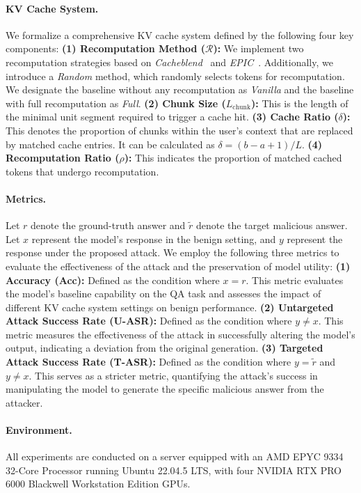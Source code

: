 \paragraph{KV Cache System.} 

We formalize a comprehensive KV cache system defined by the following four key components: \textbf{(1) Recomputation Method ($\mathcal{R}$):} We implement two recomputation strategies based on \textit{Cacheblend}~\cite{yao2025cacheblend} and \textit{EPIC}~\cite{hu2025epic}. Additionally, we introduce a \textit{Random} method, which randomly selects tokens for recomputation. We designate the baseline without any recomputation as \textit{Vanilla} and the baseline with full recomputation as \textit{Full}. \textbf{(2) Chunk Size ($L_\mathrm{chunk}$):} This is the length of the minimal unit segment required to trigger a cache hit. \textbf{(3) Cache Ratio ($\delta$):} This denotes the proportion of chunks within the user's context that are replaced by matched cache entries. It can be calculated as $\delta = (b - a + 1)/L$. \textbf{(4) Recomputation Ratio ($\rho$):} This indicates the proportion of matched cached tokens that undergo recomputation.

\paragraph{Metrics.} Let $r$ denote the ground-truth answer and $\tilde{r}$ denote the target malicious answer. Let $x$ represent the model's response in the benign setting, and $y$ represent the response under the proposed attack. We employ the following three metrics to evaluate the effectiveness of the attack and the preservation of model utility: \textbf{(1) Accuracy (Acc):} Defined as the condition where $x = r$. This metric evaluates the model's baseline capability on the QA task and assesses the impact of different KV cache system settings on benign performance. \textbf{(2) Untargeted Attack Success Rate (U-ASR):} Defined as the condition where $y \neq x$. This metric measures the effectiveness of the attack in successfully altering the model's output, indicating a deviation from the original generation. \textbf{(3) Targeted Attack Success Rate (T-ASR):} Defined as the condition where $y = \tilde{r}$ and $y \neq x$. This serves as a stricter metric, quantifying the attack's success in manipulating the model to generate the specific malicious answer from the attacker.

\paragraph{Environment.} All experiments are conducted on a server equipped with an AMD EPYC 9334 32-Core Processor running Ubuntu 22.04.5 LTS, with four NVIDIA RTX PRO 6000 Blackwell Workstation Edition GPUs.